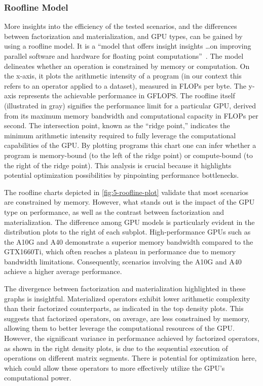 \subsubsection*{Roofline Model}
More insights into the efficiency of the tested scenarios, and the differences between factorization and materialization, and GPU types, can be gained by using a roofline model. It is a “model that offers insight insights \ldots on improving parallel software and hardware for floating point computations”~\cite{roofline}. The model delineates whether an operation is constrained by memory or computation. On the x-axis, it plots the arithmetic intensity of a program (in our context this refers to an operator applied to a dataset), measured in FLOPs per byte. The y-axis represents the achievable performance in GFLOPS. The roofline itself (illustrated in gray) signifies the performance limit for a particular GPU, derived from its maximum memory bandwidth and computational capacity in FLOPs per second. The intersection point, known as the ``ridge point,'' indicates the minimum arithmetic intensity required to fully leverage the computational capabilities of the GPU. By plotting programs this chart one can infer whether a program is memory-bound (to the left of the ridge point) or compute-bound (to the right of the ridge point). This analysis is crucial because it highlights potential optimization possibilities by pinpointing performance bottlenecks.

The roofline charts depicted in \autoref{fig:5-roofline-plot} validate that most scenarios are constrained by memory. However, what stands out is the impact of the GPU type on performance, as well as the contrast between factorization and materialization. The difference among GPU models is particularly evident in the distribution plots to the right of each subplot. High-performance GPUs such as the A10G and A40 demonstrate a superior memory bandwidth compared to the GTX1660Ti, which often reaches a plateau in performance due to memory bandwidth limitations. Consequently, scenarios involving the A10G and A40 achieve a higher average performance.

The divergence between factorization and materialization highlighted in these graphs is insightful. Materialized operators exhibit lower arithmetic complexity than their factorized counterparts, as indicated in the top density plots. This suggests that factorized operators, on average, are less constrained by memory, allowing them to better leverage the computational resources of the GPU. However, the significant variance in performance achieved by factorized operators, as shown in the right density plots, is due to the sequential execution of operations on different matrix segments. There is potential for optimization here, which could allow these operators to more effectively utilize the GPU’s computational power.

